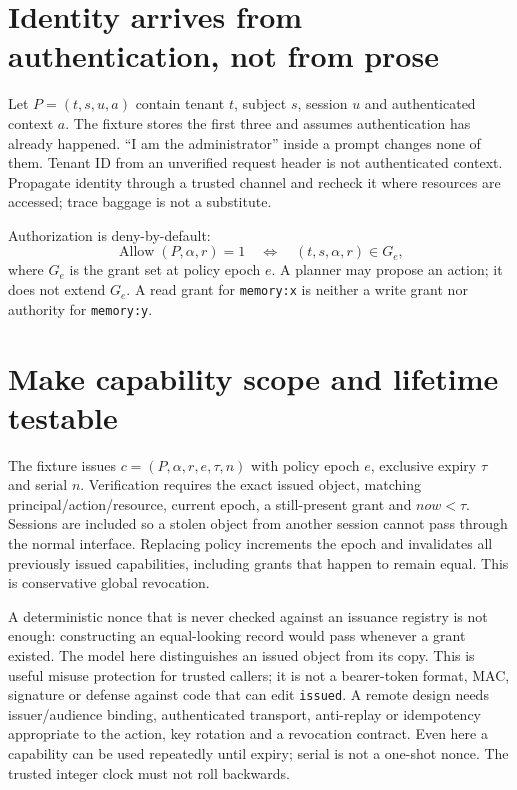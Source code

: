 \section{Identity arrives from authentication, not from prose}
\label{evod45:identity}
Let $P=(t,s,u,a)$ contain tenant $t$, subject $s$, session $u$ and authenticated
context $a$. The fixture stores the first three and assumes authentication
has already happened. ``I am the administrator'' inside a prompt changes none
of them. Tenant ID from an unverified request header is not authenticated
context. Propagate identity through a trusted channel and recheck it where
resources are accessed; trace baggage is not a substitute.

Authorization is deny-by-default:
\[
 \operatorname{Allow}(P,\alpha,r)=1
 \quad\Longleftrightarrow\quad
 (t,s,\alpha,r)\in G_e,
\]
where $G_e$ is the grant set at policy epoch $e$. A planner may propose
an action; it does not extend $G_e$. A read grant for \texttt{memory:x} is
neither a write grant nor authority for \texttt{memory:y}.


\section{Make capability scope and lifetime testable}
\label{evod45:capability}
The fixture issues $c=(P,\alpha,r,e,\tau,n)$ with policy epoch $e$, exclusive
expiry $\tau$ and serial $n$. Verification requires the exact issued object,
matching principal/action/resource, current epoch, a still-present grant and
$now<\tau$. Sessions are included so a stolen object from another session
cannot pass through the normal interface. Replacing policy increments the
epoch and invalidates all previously issued capabilities, including grants
that happen to remain equal. This is conservative global revocation.


A deterministic nonce that is never checked against an issuance registry is not
enough: constructing an equal-looking record would pass whenever a grant existed.
The model here distinguishes an issued object from its copy. This is useful
misuse protection for trusted callers; it is not a bearer-token format, MAC,
signature or defense against code that can edit \texttt{issued}. A remote
design needs issuer/audience binding, authenticated transport, anti-replay or
idempotency appropriate to the action, key rotation and a revocation contract.
Even here a capability can be used repeatedly until expiry; serial is not a
one-shot nonce. The trusted integer clock must not roll backwards.

